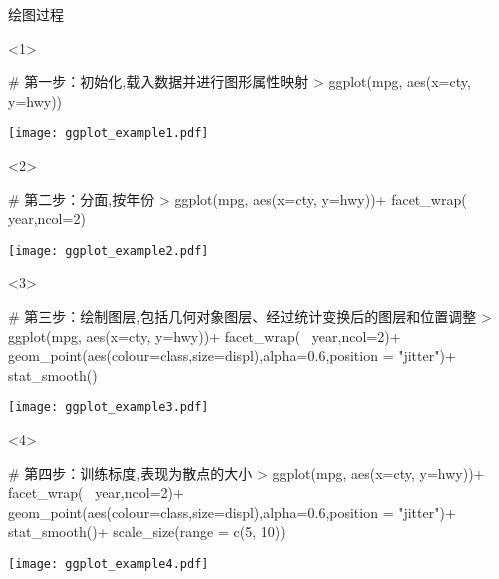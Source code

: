 \begin{frame}[c,fragile]{\subsecname}{绘图过程}

\begin{onlyenv}<1>
\begin{minipage}{\textwidth}
\begin{rcode}
# 第一步：初始化,载入数据并进行图形属性映射
> ggplot(mpg, aes(x=cty, y=hwy))
\end{rcode}
\end{minipage}
\begin{minipage}{\textwidth}
\centering
\texttt{[image: ggplot\_example1.pdf]}
\end{minipage}
\end{onlyenv}

\begin{onlyenv}<2>
\begin{minipage}{\textwidth}
\begin{rcode}
# 第二步：分面,按年份
> ggplot(mpg, aes(x=cty, y=hwy))+
      facet_wrap(~ year,ncol=2)
\end{rcode}
\end{minipage}
\begin{minipage}{\textwidth}
\centering
\texttt{[image: ggplot\_example2.pdf]}
\end{minipage}
\end{onlyenv}

\begin{onlyenv}<3>
\begin{minipage}{\textwidth}
\begin{rcode}
# 第三步：绘制图层,包括几何对象图层、经过统计变换后的图层和位置调整
> ggplot(mpg, aes(x=cty, y=hwy))+
      facet_wrap(~ year,ncol=2)+
      geom_point(aes(colour=class,size=displ),alpha=0.6,position = "jitter")+  
      stat_smooth()
\end{rcode}
\end{minipage}
\begin{minipage}{\textwidth}
\centering
\texttt{[image: ggplot\_example3.pdf]}
\end{minipage}
\end{onlyenv}

\begin{onlyenv}<4>
\begin{minipage}{\textwidth}
\begin{rcode}
# 第四步：训练标度,表现为散点的大小
> ggplot(mpg, aes(x=cty, y=hwy))+
      facet_wrap(~ year,ncol=2)+
      geom_point(aes(colour=class,size=displ),alpha=0.6,position = "jitter")+  
      stat_smooth()+  
      scale_size(range = c(5, 10))
\end{rcode}
\end{minipage}
\begin{minipage}{\textwidth}
\centering
\texttt{[image: ggplot\_example4.pdf]}
\end{minipage}
\end{onlyenv}


\end{frame}
